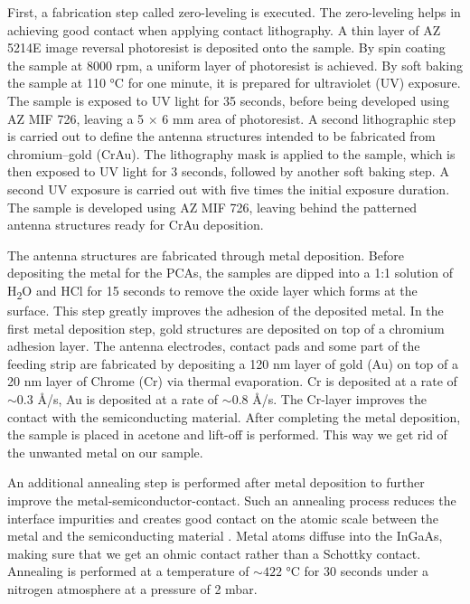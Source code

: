 First, a fabrication step called zero-leveling is executed. The zero-leveling helps in achieving good contact when applying contact lithography. A thin layer of AZ 5214E image reversal photoresist is deposited onto the sample. By spin coating the sample at 8000 rpm, a uniform layer of photoresist is achieved. 
By soft baking the sample at \num{110} \si{\celsius} for one minute, it is prepared for ultraviolet (UV) exposure. 
The sample is exposed to UV light for \num{35} seconds, before being developed using AZ MIF 726, leaving a \num{5} $\times$ \num{6} \si{\milli\meter} area of photoresist.
A second lithographic step is carried out to define the antenna structures intended to be fabricated from chromium–gold (CrAu). The lithography mask is applied to the sample, which is then exposed to UV light for \num{3} seconds, followed by another soft baking step. A second UV exposure is carried out with five times the initial exposure duration. The sample is developed using AZ MIF 726, leaving behind the patterned antenna structures ready for CrAu deposition. 

The antenna structures are fabricated through metal deposition. Before depositing the metal for the PCAs, the samples are dipped into a 1:1 solution of H\textsubscript{2}O and HCl for \num{15} seconds to remove the oxide layer which forms at the surface. This step greatly improves the adhesion of the deposited metal. In the first metal deposition step, gold structures are deposited on top of a chromium adhesion layer. The antenna electrodes, contact pads and some part of the feeding strip are fabricated by depositing a \num{120} \si{\nano\meter} layer of gold (Au) on top of a \num{20} \si{\nano\meter} layer of Chrome (Cr) via thermal evaporation. Cr is deposited at a rate of $\sim 0.3$ \si{\angstrom}/\si{\s}, Au is deposited at a rate of $\sim 0.8$ \si{\angstrom}/\si{\s}. The Cr-layer improves the contact with the semiconducting material. After completing the metal deposition, the sample is placed in acetone and lift-off is performed. This way we get rid of the unwanted metal on our sample. 

An additional annealing step is performed after metal deposition to further improve the metal-semiconductor-contact. Such an annealing process reduces the interface impurities and creates good contact on the atomic scale between the metal and the semiconducting material \cite{tahamtanInvestigationEffectAnnealing2011}. Metal atoms diffuse into the InGaAs, making sure that we get an ohmic contact rather than a Schottky contact. Annealing is performed at a temperature of $\sim 422$ \si{\celsius} for \num{30} seconds under a nitrogen atmosphere at a pressure of \num{2} \si{\milli \bar}.  

